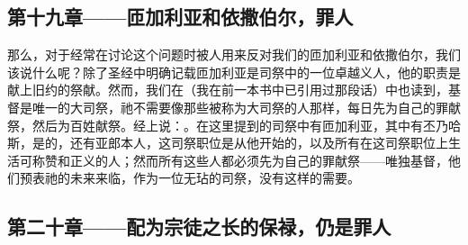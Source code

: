
\subsection{第十九章——匝加利亚和依撒伯尔，罪人}

那么，对于经常在讨论这个问题时被人用来反对我们的匝加利亚和依撒伯尔，我们该说什么呢？除了圣经中明确记载匝加利亚是司祭中的一位卓越义人，他的职责是献上旧约的祭献。然而，我们在（我在前一本书中已引用过那段话）中也读到，基督是唯一的大司祭，祂不需要像那些被称为大司祭的人那样，每日先为自己的罪献祭，然后为百姓献祭。经上说：。在这里提到的司祭中有匝加利亚，其中有丕乃哈斯，是的，还有亚郎本人，这司祭职位是从他开始的，以及所有在这司祭职位上生活可称赞和正义的人；然而所有这些人都必须先为自己的罪献祭——唯独基督，他们预表祂的未来来临，作为一位无玷的司祭，没有这样的需要。\par


\subsection{第二十章——配为宗徒之长的保禄，仍是罪人}

